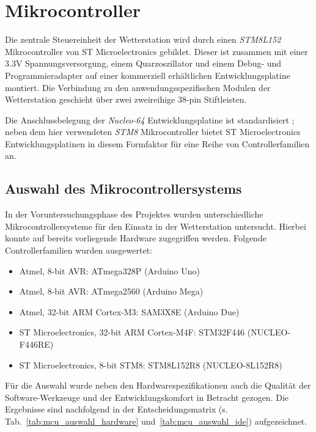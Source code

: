\pagebreak
\section{Mikrocontroller}
    Die zentrale Steuereinheit der Wetterstation wird durch einen \emph{STM8L152} Mikrocontroller von ST Microelectronics gebildet. Dieser ist zusammen mit einer 3.3V Spannungsversorgung, einem Quarzoszillator und einem Debug- und Programmieradapter auf einer kommerziell erhältlichen Entwicklungsplatine montiert. Die Verbindung zu den anwendungsspezifischen Modulen der Wetterstation geschieht über zwei zweireihige 38-pin Stiftleisten.
    
    Die Anschlussbelegung der \emph{Nucleo-64} Entwicklungsplatine ist standardisiert \cite{st_nucleo}; neben dem hier verwendeten \emph{STM8} Mikrocontroller bietet ST Microelectronics Entwicklungsplatinen in diesem Formfaktor für eine Reihe von Controllerfamilien an.
    
    \subsection{Auswahl des Mikrocontrollersystems}
    In der Voruntersuchungsphase des Projektes wurden unterschiedliche Mikrocontrollersysteme für den Einsatz in der Wetterstation untersucht. Hierbei konnte auf bereits vorliegende Hardware zugegriffen werden. Folgende Controllerfamilien wurden ausgewertet:
    \begin{itemize}
        \item Atmel, 8-bit AVR: ATmega328P (Arduino Uno)
        \item Atmel, 8-bit AVR: ATmega2560 (Arduino Mega)
        \item Atmel, 32-bit ARM Cortex-M3: SAM3X8E (Arduino Due)
        \item ST Microelectronics, 32-bit ARM Cortex-M4F: STM32F446 (NUCLEO-F446RE)
        \item ST Microelectronics, 8-bit STM8: STM8L152R8 (NUCLEO-8L152R8)
    \end{itemize}
    
    Für die Auswahl wurde neben den Hardwarespezifikationen auch die Qualität der Software-Werkzeuge und der Entwicklungskomfort in Betracht gezogen. Die Ergebnisse sind nachfolgend in der Entscheidungsmatrix (s. Tab.~\ref{tab:mcu_auswahl_hardware} und~\ref{tab:mcu_auswahl_ide}) aufgezeichnet.
    
